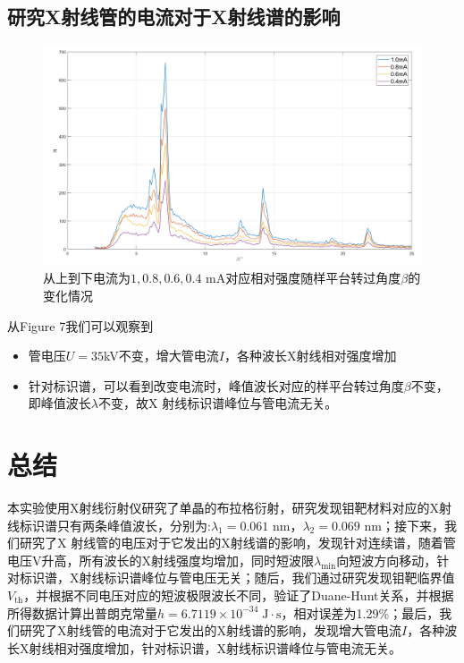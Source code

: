 \documentclass[10.5pt]{article}
\renewcommand{\=}[1]{\stackrel{#1}{=}} %
\theoremstyle{definition}
\theoremstyle{remark}
\begin{document}
	\subsection{研究X射线管的电流对于X射线谱的影响}
	\begin{figure}[H]
		\centering
		\includegraphics[scale=0.55]{current.png}
		\captionsetup{font=footnotesize}
		\caption{从上到下电流为$1,0.8,0.6,0.4$ mA对应相对强度随样平台转过角度$\beta$的变化情况}
	\end{figure}
	从Figure 7我们可以观察到
	\begin{itemize}
		\item 管电压$U=35 $kV不变，增大管电流$I$，各种波长X射线相对强度增加
		\item 针对标识谱，可以看到改变电流时，峰值波长对应的样平台转过角度$\beta$不变，即峰值波长$\lambda$不变，故X 射线标识谱峰位与管电流无关。
	\end{itemize}
	\section{总结}
	本实验使用X射线衍射仪研究了单晶的布拉格衍射，研究发现钼靶材料对应的X射线标识谱只有两条峰值波长，分别为:$\lambda_1=0.061$ nm，$\lambda_2=0.069$ nm；接下来，我们研究了X 射线管的电压对于它发出的X射线谱的影响，发现针对连续谱，随着管电压V升高，所有波长的X射线强度均增加，同时短波限$\lambda_{\min}$向短波方向移动，针对标识谱，X射线标识谱峰位与管电压无关；随后，我们通过研究发现钼靶临界值$V_{\text{th}}$，并根据不同电压对应的短波极限波长不同，验证了Duane-Hunt关系，并根据所得数据计算出普朗克常量$h=6.7119\times10^{-34}\;\text{J}\cdot\text{s}$，相对误差为1.29\%；最后，我们研究了X射线管的电流对于它发出的X射线谱的影响，发现增大管电流$I$，各种波长X射线相对强度增加，针对标识谱，X射线标识谱峰位与管电流无关。
	\appendix
	
	
\end{document}
